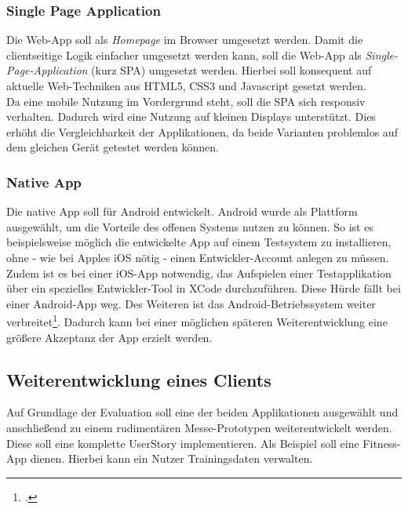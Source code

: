 \subsubsection*{Single Page Application}
\label{ssec:aufgabenstellung:spa}
Die Web-App soll als \textit{Homepage} im Browser umgesetzt werden. Damit die clientseitige Logik einfacher umgesetzt werden kann, soll die Web-App als \textit{Single-Page-Application} (kurz \ac{SPA}) umgesetzt werden. Hierbei soll konsequent auf aktuelle Web-Techniken aus HTML5, CSS3 und Javascript gesetzt werden. \\
Da eine mobile Nutzung im Vordergrund steht, soll die SPA sich \gls{responsiv} verhalten. Dadurch wird eine Nutzung auf kleinen Displays unterstützt. Dies erhöht die Vergleichbarkeit der Applikationen, da beide Varianten problemlos auf dem gleichen Gerät getestet werden können.
\subsubsection*{Native App}
\label{ssec:aufgabenstellung:nat-app}
Die native App soll für Android entwickelt. Android wurde als Plattform ausgewählt, um die Vorteile des offenen Systems nutzen zu können. So ist es beispielsweise möglich die entwickelte App auf einem Testsystem zu installieren, ohne - wie bei Apples iOS nötig - einen Entwickler-Account anlegen zu müssen.\\ 
Zudem ist es bei einer iOS-App notwendig, das Aufspielen einer Testapplikation über ein spezielles Entwickler-Tool in XCode durchzuführen. Diese Hürde fällt bei einer Android-App weg. Des Weiteren ist das Android-Betriebssystem weiter verbreitet\footcite{Statista-SmartphoneVerteilung}. Dadurch kann bei einer möglichen späteren Weiterentwicklung eine größere Akzeptanz der App erzielt werden.
\subsection{Weiterentwicklung eines Clients}
\label{ssec:umsetzung-client-entwicklung}
Auf Grundlage der Evaluation soll eine der beiden Applikationen ausgewählt und anschließend zu einem rudimentären Messe-Prototypen weiterentwickelt werden. Diese soll eine komplette \gls{UserStory} implementieren. Als Beispiel soll eine Fitness-App dienen. Hierbei kann ein Nutzer Trainingsdaten verwalten. 
